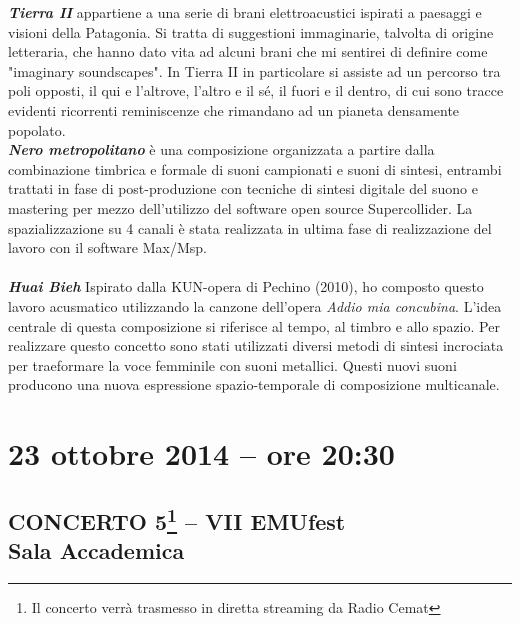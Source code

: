 \documentclass[9pt, twoside, a5paper]{extreport}
\newcommand{\descrizione}[2]{%
\noindent \textbf{\textit{#1}} %
#2 %
\\
}%
\begin{document}
\begin{multicols}{2}
\descrizione{Tierra II}{appartiene a una serie di brani elettroacustici ispirati a paesaggi e visioni della Patagonia. Si tratta di suggestioni immaginarie, talvolta di origine letteraria, che hanno dato vita ad alcuni brani che mi sentirei di definire come "imaginary soundscapes". In Tierra II in particolare si assiste ad un percorso tra poli opposti, il qui e l'altrove, l'altro e il sé, il fuori e il dentro, di cui sono tracce evidenti ricorrenti reminiscenze che rimandano ad un pianeta densamente popolato.}


\descrizione{Nero metropolitano}{è una composizione organizzata a partire dalla combinazione timbrica e formale di suoni campionati e suoni di sintesi, entrambi trattati in fase di post-produzione con tecniche di sintesi digitale del suono e mastering per mezzo dell'utilizzo del software open source Supercollider. La spazializzazione su 4 canali è stata realizzata in ultima fase di realizzazione del lavoro con il software Max/Msp.}
\\

\descrizione{Huai Bieh}{Ispirato dalla KUN-opera di Pechino (2010), ho composto questo lavoro acusmatico utilizzando la canzone dell'opera \textit{Addio mia concubina}. L'idea centrale di questa composizione si riferisce al tempo, al timbro e allo spazio. Per realizzare questo concetto sono stati utilizzati diversi metodi di sintesi incrociata per traeformare la voce femminile con suoni metallici. Questi nuovi suoni producono una nuova espressione spazio-temporale di composizione multicanale.}

\end{multicols}

\clearpage



\section*{23 ottobre 2014 -- ore 20:30}
\subsection*{{\small CONCERTO 5\footnote{{\normalsize Il concerto verrà trasmesso in diretta streaming da Radio Cemat}} -- VII EMUfest\\}\textsf{Sala Accademica\\}}
\end{document}
